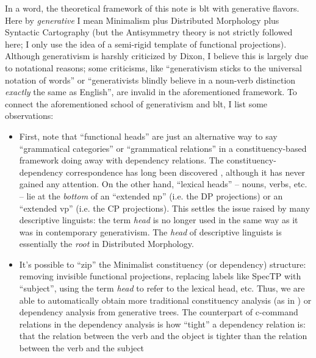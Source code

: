 \documentclass[a4paper, oneside]{report}
\newcommand*{\term}[1]{\emph{#1}}
\begin{document}
In a word, the theoretical framework of this note 
is \ac{blt}\citep{dixon2009basic1,dixon2010basic2,dixon2012basic3}
with generative flavors.
Here by \term{generative} I mean 
Minimalism plus Distributed Morphology plus Syntactic Cartography 
(but the Antisymmetry theory is not strictly followed here; 
I only use the idea of a semi-rigid template of functional projections).
Although generativism is harshly criticized by Dixon, 
I believe this is largely due to notational reasons;
some criticisms, like ``generativism sticks to the universal notation of words''
or ``generativists blindly believe in a 
noun-verb distinction \emph{exactly} the same as English'',
are invalid in the aforementioned framework. 
To connect the aforementioned school of generativism and \ac{blt}, 
I list some observations:
\begin{itemize}
    \item First, note that ``functional heads'' are just 
        an alternative way to say ``grammatical categories'' or ``grammatical relations''
        in a constituency-based framework doing away with dependency relations.
        The constituency-dependency correspondence 
        has long been discovered \citep{schneider1998linguistic,osborne2011bare,kahane2015syntactic}, 
        although it has never gained any attention. 
        On the other hand, 
        ``lexical heads'' -- nouns, verbs, etc. -- 
        lie at the \emph{bottom} of an ``extended \ac{np}'' (i.e. the DP projections) 
        or an ``extended \ac{vp}'' (i.e. the CP projections).
        This settles the issue raised by many descriptive linguists: 
        the term \term{head} is no longer used in the same way 
        as it was in contemporary generativism.
        The \term{head} of descriptive linguists is essentially the \term{root} in Distributed Morphology.
    \item It's possible to ``zip'' the Minimalist constituency (or dependency) structure: 
        removing invisible functional projections, 
        replacing labels like SpecTP with ``subject'',
        using the term \term{head} to refer to the lexical head, etc.
        Thus, we are able to automatically 
        obtain more traditional constituency analysis (as in \citet{cgel})
        or dependency analysis 
        from generative trees. 
        The counterpart of c-command relations in the dependency analysis 
        is how ``tight'' a dependency relation is:
        that the relation between the verb and the object is tighter 
        than the relation between the verb and the subject 

\end{itemize}
\end{document}
